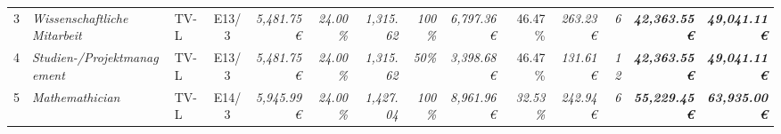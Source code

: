 \begin{table}[]
\begin{tabular}{clllcrrrrrrrrrr}
3                                                                                       & \multicolumn{2}{l}{\cellcolor[HTML]{FFFF99}\textit{Wissenschaftliche Mitarbeit}}      & \cellcolor[HTML]{FFFF99}TV-L      & \cellcolor[HTML]{FFFF99}E13/3                & \cellcolor[HTML]{FFFF99}\textit{5,481.75 €}         & \textit{24.00\%}                                      & \textit{1,315.62}                            & \cellcolor[HTML]{FFFF99}\textit{100\%}                  & \cellcolor[HTML]{92D050}\textit{6,797.36 €}  & 46.47 \%                                       & \cellcolor[HTML]{92D050}\textit{263.23 €}    & \cellcolor[HTML]{FFFF99}\textit{6}           & \cellcolor[HTML]{BFBFBF}\textit{\textbf{42,363.55 €}}           & \textit{\textbf{49,041.11 €}}                                                                 \\
4                                                                                       & \multicolumn{2}{l}{\cellcolor[HTML]{FFFF99}\textit{Studien-/Projektmanagement}}       & \cellcolor[HTML]{FFFF99}TV-L      & \cellcolor[HTML]{FFFF99}E13/3                & \cellcolor[HTML]{FFFF99}\textit{5,481.75 €}         & \textit{24.00\%}                                      & \textit{1,315.62}                            & \cellcolor[HTML]{FFFF99}\textit{50\%}                   & \cellcolor[HTML]{92D050}\textit{3,398.68 €}  & 46.47 \%                                       & \cellcolor[HTML]{92D050}\textit{131.61 €}    & \cellcolor[HTML]{FFFF99}\textit{12}          & \cellcolor[HTML]{BFBFBF}\textit{\textbf{42,363.55 €}}           & \textit{\textbf{49,041.11 €}}                                                                 \\
5                                                                                       & \multicolumn{2}{l}{\cellcolor[HTML]{FFFF99}\textit{Mathemathician}}                   & \cellcolor[HTML]{FFFF99}TV-L      & \cellcolor[HTML]{FFFF99}E14/3                & \cellcolor[HTML]{FFFF99}\textit{5,945.99 €}         & \textit{24.00\%}                                      & \textit{1,427.04}                            & \cellcolor[HTML]{FFFF99}\textit{100\%}                  & \cellcolor[HTML]{92D050}\textit{8,961.96 €}  & \cellcolor[HTML]{FFFF99}\textit{32.53\%}       & \cellcolor[HTML]{92D050}\textit{242.94 €}    & \cellcolor[HTML]{FFFF99}\textit{6}           & \cellcolor[HTML]{BFBFBF}\textit{\textbf{55,229.45 €}}           & \textit{\textbf{63,935.00 €}}                                                                 \\

\end{tabular}
\end{table}
